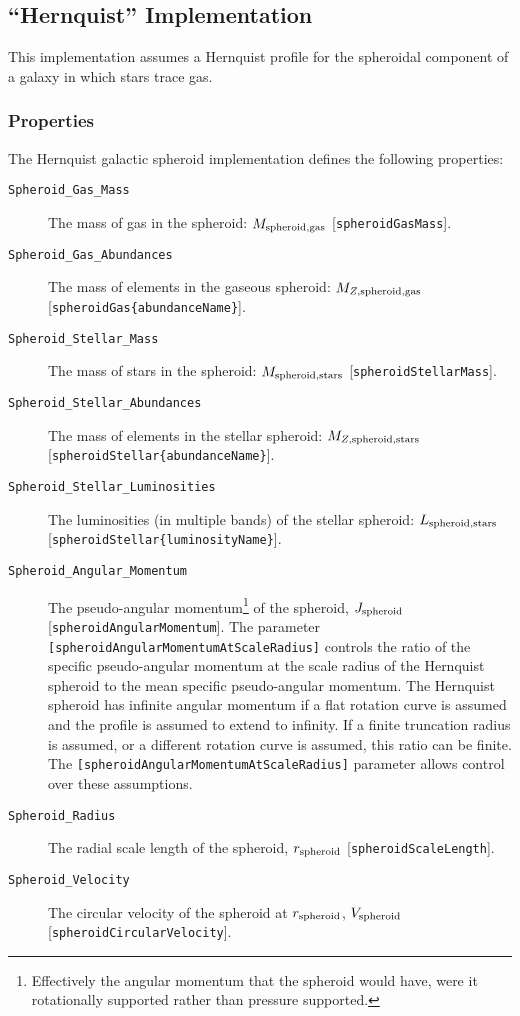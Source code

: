 \subsection{``Hernquist'' Implementation}

This implementation assumes a Hernquist profile \citep{hernquist_analytical_1990} for the spheroidal component of a galaxy in which stars trace gas.

\subsubsection{Properties}

The Hernquist galactic spheroid implementation defines the following properties:
\begin{description}
 \item [{\tt Spheroid\_Gas\_Mass}] The mass of gas in the spheroid: $M_{\rm spheroid, gas}$ [{\tt spheroidGasMass}].
 \item [{\tt Spheroid\_Gas\_Abundances}] The mass of elements in the gaseous spheroid: $M_{Z, {\rm spheroid, gas}}$ [{\tt spheroidGas\{abundanceName\}}].
 \item [{\tt Spheroid\_Stellar\_Mass}] The mass of stars in the spheroid: $M_{\rm spheroid, stars}$ [{\tt spheroidStellarMass}].
 \item [{\tt Spheroid\_Stellar\_Abundances}] The mass of elements in the stellar spheroid: $M_{Z, {\rm spheroid, stars}}$ [{\tt spheroidStellar\{abundanceName\}}].
 \item [{\tt Spheroid\_Stellar\_Luminosities}] The luminosities (in multiple bands) of the stellar spheroid: $L_{\rm spheroid, stars}$ [{\tt spheroidStellar\{luminosityName\}}].
 \item [{\tt Spheroid\_Angular\_Momentum}] The pseudo-angular momentum\footnote{Effectively the angular momentum that the spheroid would have, were it rotationally supported rather than pressure supported.} of the spheroid, $J_{\rm spheroid}$ [{\tt spheroidAngularMomentum}]. The parameter {\tt [spheroidAngularMomentumAtScaleRadius]} controls the ratio of the specific pseudo-angular momentum at the scale radius of the Hernquist spheroid to the mean specific pseudo-angular momentum. The Hernquist spheroid has infinite angular momentum if a flat rotation curve is assumed and the profile is assumed to extend to infinity. If a finite truncation radius is assumed, or a different rotation curve is assumed, this ratio can be finite. The {\tt [spheroidAngularMomentumAtScaleRadius]} parameter allows control over these assumptions.
 \item [{\tt Spheroid\_Radius}] The radial scale length of the spheroid, $r_{\rm spheroid}$ [{\tt spheroidScaleLength}].
 \item [{\tt Spheroid\_Velocity}] The circular velocity of the spheroid at $r_{\rm spheroid}$, $V_{\rm spheroid}$ [{\tt spheroidCircularVelocity}].
\end{description}
